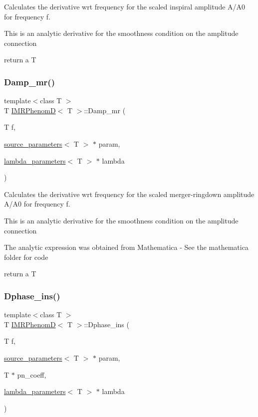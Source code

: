 Calculates the derivative wrt frequency for the scaled inspiral amplitude A/\+A0 for frequency f. 

This is an analytic derivative for the smoothness condition on the amplitude connection

return a T \mbox{\label{classIMRPhenomD_a59796cb7f1ac68684562508a5a83d505}} 
\subsubsection{\texorpdfstring{Damp\+\_\+mr()}{Damp\_mr()}}
{\footnotesize\ttfamily template$<$class T $>$ \\
T \hyperlink{classIMRPhenomD}{I\+M\+R\+PhenomD}$<$ T $>$\+::Damp\+\_\+mr (\begin{DoxyParamCaption}\item[{T}]{f,  }\item[{\hyperlink{structsource__parameters}{source\+\_\+parameters}$<$ T $>$ $\ast$}]{param,  }\item[{\hyperlink{structlambda__parameters}{lambda\+\_\+parameters}$<$ T $>$ $\ast$}]{lambda }\end{DoxyParamCaption})\hspace{0.3cm}{\ttfamily [virtual]}}



Calculates the derivative wrt frequency for the scaled merger-\/ringdown amplitude A/\+A0 for frequency f. 

This is an analytic derivative for the smoothness condition on the amplitude connection

The analytic expression was obtained from Mathematica -\/ See the mathematica folder for code

return a T \mbox{\label{classIMRPhenomD_ab840b052576cde8a9e802c5784d24092}} 
\subsubsection{\texorpdfstring{Dphase\+\_\+ins()}{Dphase\_ins()}}
{\footnotesize\ttfamily template$<$class T $>$ \\
T \hyperlink{classIMRPhenomD}{I\+M\+R\+PhenomD}$<$ T $>$\+::Dphase\+\_\+ins (\begin{DoxyParamCaption}\item[{T}]{f,  }\item[{\hyperlink{structsource__parameters}{source\+\_\+parameters}$<$ T $>$ $\ast$}]{param,  }\item[{T $\ast$}]{pn\+\_\+coeff,  }\item[{\hyperlink{structlambda__parameters}{lambda\+\_\+parameters}$<$ T $>$ $\ast$}]{lambda }\end{DoxyParamCaption})\hspace{0.3cm}{\ttfamily [virtual]}}




